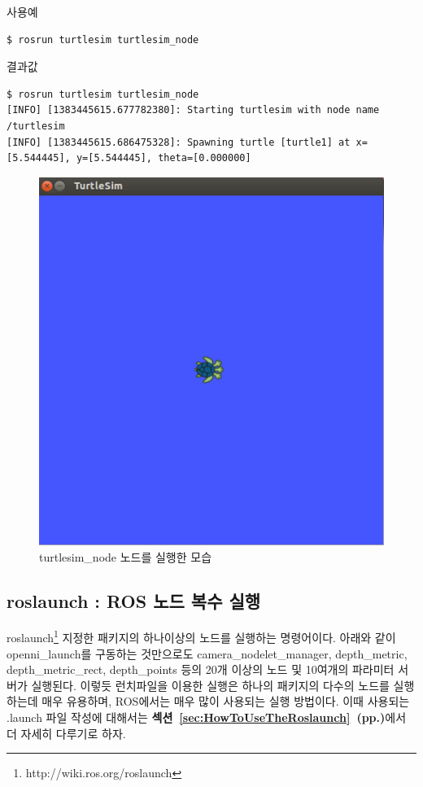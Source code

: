 \noindent
{}\circled{\thenum} 사용예
\begin{lstlisting}[language=ROS]
$ rosrun turtlesim turtlesim_node 
\end{lstlisting}

\noindent
{}\circled{\thenum} 결과값
\begin{lstlisting}[language=ROS]
$ rosrun turtlesim turtlesim_node 
[INFO] [1383445615.677782380]: Starting turtlesim with node name /turtlesim
[INFO] [1383445615.686475328]: Spawning turtle [turtle1] at x=[5.544445], y=[5.544445], theta=[0.000000]
\end{lstlisting}

\begin{figure}[h]
\centering\includegraphics[width=0.7\columnwidth]{pictures/chapter5/term_rosrun.png}
\caption{turtlesim\_node 노드를 실행한 모습}
\end{figure}

\newpage
\subsection{roslaunch : ROS 노드 복수 실행}

roslaunch\footnote{http://wiki.ros.org/roslaunch} 지정한 패키지의 하나이상의 노드를 실행하는 명령어이다. 아래와 같이 openni\_launch를 구동하는 것만으로도 camera\_nodelet\_manager, depth\_metric, depth\_metric\_rect, depth\_points 등의 20개 이상의 노드 및 10여개의 파라미터 서버가 실행된다. 이렇듯 런치파일을 이용한 실행은 하나의 패키지의 다수의 노드를 실행하는데 매우 유용하며, ROS에서는 매우 많이 사용되는 실행 방법이다. 이때 사용되는 .launch 파일 작성에 대해서는 \textbf{섹션~\ref{sec:HowToUseTheRoslaunch}~(pp.\pageref{sec:HowToUseTheRoslaunch})}에서 더 자세히 다루기로 하자.

